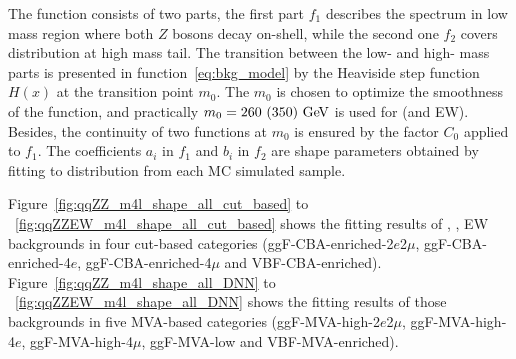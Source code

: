 The function consists of two parts, the first part $f_{1}$ describes the \mfl spectrum in low mass region where both $Z$ bosons decay on-shell, while the second one $f_{2}$ covers distribution at high mass tail.
The transition between the low- and high- mass parts is presented in function~\ref{eq:bkg_model} by the Heaviside step function $H(x)$ at the transition point $m_0$.
The $m_0$ is chosen to optimize the smoothness of the function, and practically $m_0 = 260~(350)~\text{Ge\kern -0.1em V}$ is used for \qqZZ (\ggZZ and \qqZZ EW).
Besides, the continuity of two functions at $m_0$ is ensured by the factor $C_0$ applied to $f_{1}$.
The coefficients $a_{i}$ in $f_{1}$ and $b_{i}$ in $f_{2}$ are shape parameters obtained by fitting to \mfl distribution from each MC simulated sample.

Figure~\ref{fig:qqZZ_m4l_shape_all_cut_based} to ~\ref{fig:qqZZEW_m4l_shape_all_cut_based} shows the fitting results of \qqZZ, \ggZZ, \qqZZ EW backgrounds in four cut-based categories (ggF-CBA-enriched-2$e$2$\mu$, ggF-CBA-enriched-4$e$, ggF-CBA-enriched-4$\mu$ and VBF-CBA-enriched).
Figure~\ref{fig:qqZZ_m4l_shape_all_DNN} to ~\ref{fig:qqZZEW_m4l_shape_all_DNN} shows the fitting results of those backgrounds in five MVA-based categories (ggF-MVA-high-2$e$2$\mu$, ggF-MVA-high-4$e$, ggF-MVA-high-4$\mu$, ggF-MVA-low and VBF-MVA-enriched).

